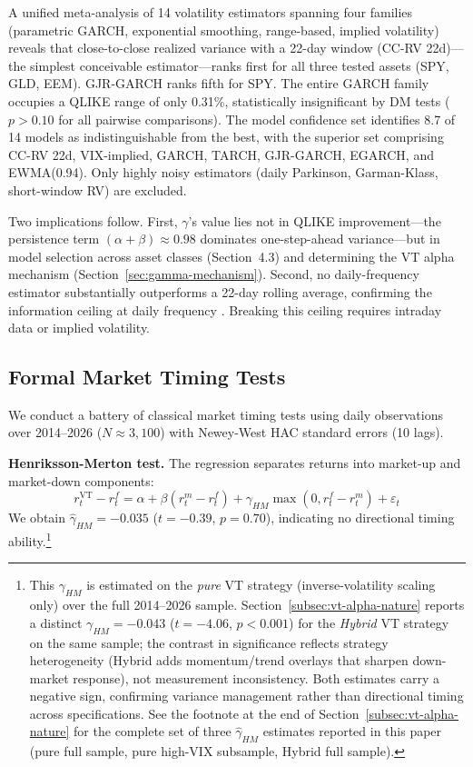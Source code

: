 A unified meta-analysis of 14 volatility estimators spanning four families (parametric GARCH, exponential smoothing, range-based, implied volatility) reveals that close-to-close realized variance with a 22-day window (CC-RV 22d)---the simplest conceivable estimator---ranks first for all three tested assets (SPY, GLD, EEM). GJR-GARCH ranks fifth for SPY. The entire GARCH family occupies a QLIKE range of only 0.31\%, statistically insignificant by DM tests ($p > 0.10$ for all pairwise comparisons). The model confidence set \citep{hansen2005} identifies 8.7 of 14 models as indistinguishable from the best, with the superior set comprising CC-RV 22d, VIX-implied, GARCH, TARCH, GJR-GARCH, EGARCH, and EWMA(0.94). Only highly noisy estimators (daily Parkinson, Garman-Klass, short-window RV) are excluded.

Two implications follow. First, $\gamma$'s value lies not in QLIKE improvement---the persistence term $(\alpha + \beta) \approx 0.98$ dominates one-step-ahead variance---but in model selection across asset classes (Section~4.3) and determining the VT alpha mechanism (Section~\ref{sec:gamma-mechanism}). Second, no daily-frequency estimator substantially outperforms a 22-day rolling average, confirming the information ceiling at daily frequency \citep{patton2011}. Breaking this ceiling requires intraday data or implied volatility.

\subsection{Formal Market Timing Tests}
\label{sec:timing_tests}

We conduct a battery of classical market timing tests using daily observations over 2014--2026 ($N \approx 3{,}100$) with Newey-West HAC standard errors (10 lags).

\textbf{Henriksson-Merton test.} The \citet{henriksson1981} regression separates returns into market-up and market-down components:
\begin{equation}
r^{\text{VT}}_t - r^f_t = \alpha + \beta (r^m_t - r^f_t) + \gamma_{HM} \max(0, r^f_t - r^m_t) + \varepsilon_t
\end{equation}
We obtain $\hat{\gamma}_{HM} = -0.035$ ($t = -0.39$, $p = 0.70$), indicating no directional timing ability.\footnote{This $\gamma_{HM}$ is estimated on the \emph{pure} VT strategy (inverse-volatility scaling only) over the full 2014--2026 sample. Section~\ref{subsec:vt-alpha-nature} reports a distinct $\gamma_{HM} = -0.043$ ($t = -4.06$, $p < 0.001$) for the \emph{Hybrid} VT strategy on the same sample; the contrast in significance reflects strategy heterogeneity (Hybrid adds momentum/trend overlays that sharpen down-market response), not measurement inconsistency. Both estimates carry a negative sign, confirming variance management rather than directional timing across specifications. See the footnote at the end of Section~\ref{subsec:vt-alpha-nature} for the complete set of three $\hat{\gamma}_{HM}$ estimates reported in this paper (pure full sample, pure high-VIX subsample, Hybrid full sample).}

